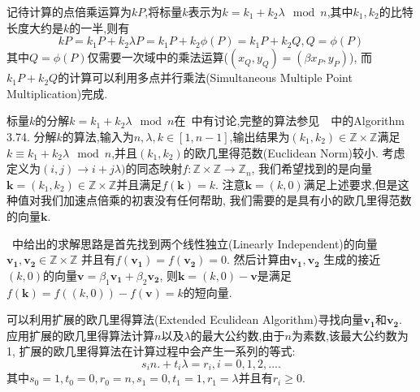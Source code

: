 \documentclass{article}
\newcommand{\Z}{\mathbb{Z}}
\begin{document}
记待计算的点倍乘运算为$kP$,将标量$k$表示为$k=k_1+k_2\lambda \mod n$,其中$k_1, k_2$的比特长度大约是$k$的一半,则有
$$kP = k_1P + k_2\lambda P = k_1P + k_2\phi(P) = k_1 P + k_2 Q, Q = \phi(P)$$
其中$Q=\phi(P)$仅需要一次域中的乘法运算($(x_Q, y_Q) = (\beta x_P, y_P)$),
而$k_1 P + k_2 Q$的计算可以利用多点并行乘法(Simultaneous Multiple Point Multiplication)完成.

标量$k$的分解$k=k_1+k_2\lambda \mod n$在~\cite{glv01}中有讨论,完整的算法参见~\cite{guidetoecc}~中的Algorithm 3.74.
分解$k$的算法,输入为$n, \lambda, k\in [1, n-1]$,输出结果为$(k_1, k_2) \in \Z \times \Z$满足
$k \equiv k_1 + k_2 \lambda \mod n$,并且$(k_1, k_2)$的欧几里得范数(Euclidean Norm)较小.
考虑定义为$(i,j) \rightarrow i + j\lambda)$的同态映射$f: \Z\times\Z \rightarrow \Z_n$,
我们希望找到的是向量$\mathbf{k}=(k_1, k_2)\in \Z\times\Z$并且满足$f(\mathbf{k})= k$.
注意$\mathbf{k} = (k, 0)$满足上述要求,但是这种值对我们加速点倍乘的初衷没有任何帮助,
我们需要的是具有小的欧几里得范数的向量$\mathbf{k}$.

~\cite{glv01}中给出的求解思路是首先找到两个线性独立(Linearly Independent)的向量$\mathbf{v_1}, \mathbf{v_2} \in \Z \times \Z$
并且有$f(\mathbf{v_1}) = f(\mathbf{v_2}) = 0$. 然后计算由$\mathbf{v_1}, \mathbf{v_2}$
生成的接近$(k,0)$的向量$\mathbf{v} = \beta_1\mathbf{v_1} + \beta_2\mathbf{v_2}$,
则$\mathbf{k} = (k,0) - \mathbf{v}$是满足$f(\mathbf{k}) = f((k,0)) - f(\mathbf{v}) = k$的短向量.

可以利用扩展的欧几里得算法(Extended Eculidean Algorithm)寻找向量$\mathbf{v_1}$和$\mathbf{v_2}$.
应用扩展的欧几里得算法计算$n$以及$\lambda$的最大公约数,由于$n$为素数,该最大公约数为1,
扩展的欧几里得算法在计算过程中会产生一系列的等式:
\begin{equation}
\label{eq-eea}
s_i n. + t_i \lambda = r_i, i = 0, 1, 2, ....
\end{equation}
其中$s_0 = 1, t_0 = 0, r_0 = n, s_1 =0, t_1 = 1, r_1 = \lambda$并且有$r_i \ge 0$.
\end{document}
